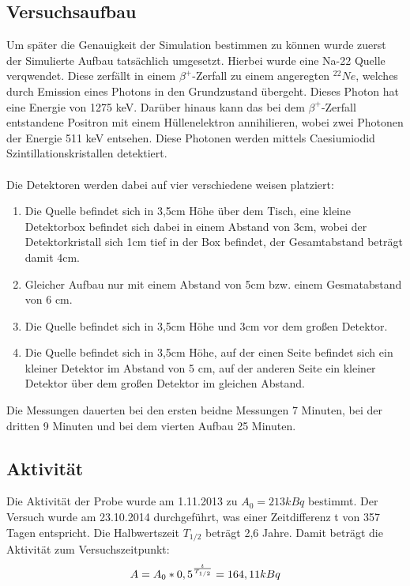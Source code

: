\documentclass[a4paper,11pt,twoside]{article}
\begin{document}
\subsection{Versuchsaufbau}
Um später die Genauigkeit der Simulation bestimmen zu können wurde zuerst der Simulierte Aufbau tatsächlich umgesetzt. Hierbei wurde eine Na-22 Quelle verqwendet. Diese zerfällt in einem $\beta^+$-Zerfall zu einem angeregten $^{22}Ne$, welches durch Emission eines Photons in den Grundzustand übergeht. Dieses Photon hat eine Energie von 1275 keV. Darüber hinaus kann das bei dem $\beta^+$-Zerfall entstandene Positron mit einem Hüllenelektron annihilieren, wobei zwei Photonen der Energie 511 keV entsehen.
Diese Photonen werden mittels Caesiumiodid Szintillationskristallen detektiert. \\\\Die Detektoren werden dabei auf vier verschiedene weisen platziert:
\begin{enumerate}
\item Die Quelle befindet sich in 3,5cm Höhe über dem Tisch, eine kleine Detektorbox befindet sich dabei in einem Abstand von 3cm, wobei der Detektorkristall sich 1cm tief in der Box befindet, der Gesamtabstand beträgt damit 4cm.
\item Gleicher Aufbau nur mit einem Abstand von 5cm bzw. einem Gesmatabstand von 6 cm.
\item Die Quelle befindet sich in 3,5cm Höhe und 3cm vor dem großen Detektor.
\item Die Quelle befindet sich in 3,5cm Höhe, auf der einen Seite befindet sich ein kleiner Detektor im Abstand von 5 cm, auf der anderen Seite ein kleiner Detektor über dem großen Detektor im gleichen Abstand.
\end{enumerate}
Die Messungen dauerten bei den ersten beidne Messungen 7 Minuten, bei der dritten 9 Minuten und bei dem vierten Aufbau 25 Minuten.


\subsection{Aktivität}
Die Aktivität der Probe wurde am 1.11.2013 zu $A_0=213 kBq$ bestimmt. Der Versuch wurde am 23.10.2014 durchgeführt, was einer Zeitdifferenz t von 357 Tagen entspricht. Die Halbwertszeit $T_{1/2}$ beträgt 2,6 Jahre. Damit beträgt die Aktivität zum Versuchszeitpunkt:
\begin{equation}
A=A_0*0,5^{t\over T_{1/2}}=164,11 kBq
\end{equation}
\end{document}
